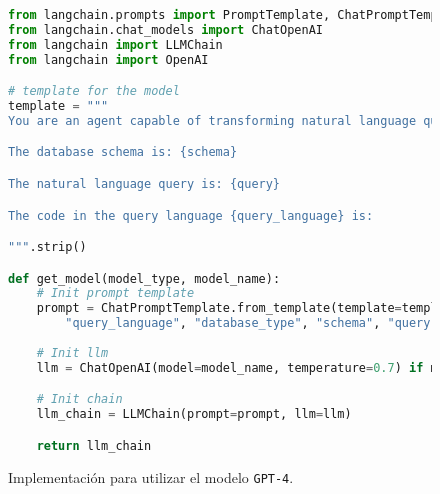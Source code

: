 \begin{figure}[H]
\begin{lstlisting}[language=python]
from langchain.prompts import PromptTemplate, ChatPromptTemplate
from langchain.chat_models import ChatOpenAI
from langchain import LLMChain
from langchain import OpenAI

# template for the model
template = """
You are an agent capable of transforming natural language queries to queries in the query language {query_language}. Your task is: Given a database schema of type {database_type} and a query written in human natural language, return only the code to answer that query in the query language {query_language} and respect the relations directions.

The database schema is: {schema}

The natural language query is: {query}

The code in the query language {query_language} is:

""".strip()

def get_model(model_type, model_name):
    # Init prompt template
    prompt = ChatPromptTemplate.from_template(template=template) if model_type == "chat" else PromptTemplate(template=template, input_variables=[
        "query_language", "database_type", "schema", "query"])
    
    # Init llm
    llm = ChatOpenAI(model=model_name, temperature=0.7) if model_type == "chat" else OpenAI(temperature=0.7)

    # Init chain
    llm_chain = LLMChain(prompt=prompt, llm=llm)

    return llm_chain
\end{lstlisting}
\caption{Implementación para utilizar el modelo \texttt{GPT-4}.}
\label{code:schemamaker}
\end{figure}